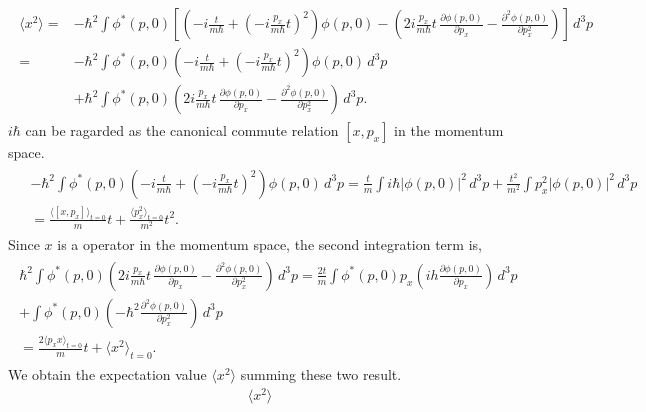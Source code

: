 \documentclass[floatfix,nofootinbib,superscriptaddress,fleqn]{revtex4-2}
\begin{document}
\begin{itemize}
  \begin{align*}
    \begin{split}       
      \langle x^2 \rangle =& -\hbar^2\int\phi^*(p,0)
      \left[\left(-i\frac{t}{m\hbar}
      +\left(-i\frac{p_x}{m\hbar}t \right)^2\right)\phi(p,0)
      -\left(2i\frac{p_x}{m\hbar}t\,\frac{\partial \phi(p,0)}{\partial p_x}
      -\frac{\partial^2 \phi(p,0)}{\partial p_x^2}\right) \right]\,d^3p  \\
      =&-\hbar^2\int\phi^*(p,0)\left(-i\frac{t}{m\hbar}
      +\left(-i\frac{p_x}{m\hbar}t \right)^2\right)\phi(p,0)\,d^3p  \\
      &+\hbar^2\int\phi^*(p,0)\left(2i\frac{p_x}{m\hbar}t\,
      \frac{\partial\phi(p,0)}{\partial p_x}
      -\frac{\partial^2 \phi(p,0)}{\partial p_x^2}\right)\,d^3p .
    \end{split}
  \end{align*}
  $i\hbar $ can be ragarded as the canonical commute relation $[x,p_x]$
  in the momentum space.
  \begin{align*}
    \begin{split}
      &-\hbar^2\int\phi^*(p,0)\left(-i\frac{t}{m\hbar}
      +\left(-i\frac{p_x}{m\hbar}t \right)^2\right)\phi(p,0)\,d^3p 
      =\frac{t}{m}\int i\hbar|\phi(p,0)|^2\,d^3p+\frac{t^2}{m^2}
      \int p_x^2|\phi(p,0)|^2\,d^3p \\
      &=\frac{\langle[x,p_x]\rangle_{t=0}}{m}t
      +\frac{\langle p_x^2\rangle_{t=0}}{m^2}t^2.
    \end{split}
  \end{align*}
  Since $x$ is a operator in the momentum space, 
  the second integration term is,
  \begin{align*}
    \begin{split}
      \hbar^2\int\phi^*(p,0)\left(2i\frac{p_x}{m\hbar}t\,
      \frac{\partial \phi(p,0)}{\partial p_x}
      -\frac{\partial^2 \phi(p,0)}{\partial p_x^2}\right)\,d^3p 
      =\frac{2t}{m}\int\phi^*(p,0)p_x
      \left(ih\frac{\partial\phi(p,0)}{\partial p_x}\right)\,d^3p  \\
      +\int\phi^*(p,0)\left(
        -\hbar^2\frac{\partial^2\phi(p,0)}{\partial p_x^2}\right)\,d^3p  \\
      =\frac{2\langle p_xx\rangle_{t=0}}{m}t+\langle x^2\rangle_{t=0}.
    \end{split}
  \end{align*}
  We obtain the expectation value $\langle x^2 \rangle$ summing these 
  two result.
  \begin{align}\label{eq:2-1}
    \langle x^2 \rangle 

\end{align}
\end{itemize}
\end{document}
